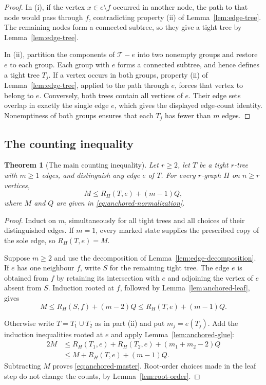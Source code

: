 \documentclass[11pt]{article}
\numberwithin{equation}{section}
\newtheorem{theorem}{Theorem}[section]
\theoremstyle{definition}
\begin{document}
\begin{proof}
In (i), if the vertex $x\in e\setminus f$ occurred in another node,
the path to that node would pass through $f$, contradicting
property (ii) of Lemma~\ref{lem:edge-tree}.  The remaining nodes form
a connected subtree, so they
give a tight tree by Lemma~\ref{lem:edge-tree}.

In (ii), partition the components of $\mathscr T-e$ into two nonempty
groups and restore $e$ to each group.  Each group with $e$ forms a
connected subtree, and hence defines a tight tree $T_j$.  If a vertex
occurs in both groups, property (ii) of Lemma~\ref{lem:edge-tree},
applied to the path through $e$, forces that vertex to belong to $e$.
Conversely, both trees contain
all vertices of $e$.  Their edge sets overlap in exactly the single
edge $e$, which gives the displayed edge-count identity.  Nonemptiness
of both groups ensures that each $T_j$ has fewer than $m$ edges.
\end{proof}

\subsection{The counting inequality}

\begin{theorem}[The main counting inequality]
\label{thm:anchored-master}
Let $r\geq2$, let $T$ be a tight $r$-tree with $m\geq1$ edges,
and distinguish any edge $e$ of $T$.  For every $r$-graph $H$ on
$n\geq r$ vertices,
\begin{equation}
 M\leq R_H(T,e)+(m-1)Q,
 \label{eq:anchored-master}
\end{equation}
where $M$ and $Q$ are given in \eqref{eq:anchored-normalization}.
\end{theorem}

\begin{proof}
Induct on $m$, simultaneously for all tight trees and all choices
of their distinguished edges.  If $m=1$, every marked state supplies
the prescribed copy of the sole edge, so $R_H(T,e)=M$.

Suppose $m\geq2$ and use the decomposition of
Lemma~\ref{lem:edge-decomposition}.  If $e$ has one neighbour $f$,
write $S$ for the remaining tight tree.  The edge $e$ is obtained
from $f$ by retaining its intersection with $e$ and adjoining the
vertex of $e$ absent from $S$.  Induction rooted at $f$, followed by
Lemma~\ref{lem:anchored-leaf}, gives
\[
 M\leq R_H(S,f)+(m-2)Q
   \leq R_H(T,e)+(m-1)Q.
\]

Otherwise write $T=T_1\cup T_2$ as in part (ii) and put
$m_j=e(T_j)$.  Add the induction inequalities rooted at $e$ and apply
Lemma~\ref{lem:anchored-glue}:
\[
 \begin{aligned}
 2M
 &\leq R_H(T_1,e)+R_H(T_2,e)+(m_1+m_2-2)Q\\
 &\leq M+R_H(T,e)+(m-1)Q.
 \end{aligned}
\]
Subtracting $M$ proves \eqref{eq:anchored-master}.  Root-order choices
made in the leaf step do not change the counts, by
Lemma~\ref{lem:root-order}.
\end{proof}
\end{document}
